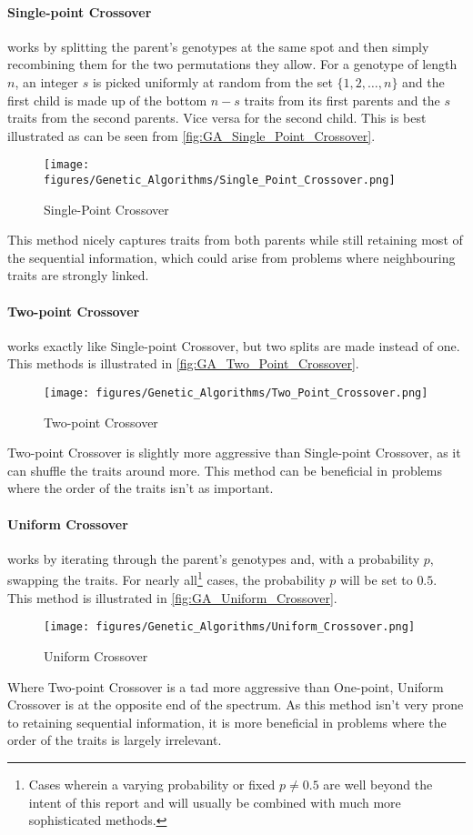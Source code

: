 \paragraph{Single-point Crossover} works by splitting the parent's genotypes at the same spot and then simply recombining them for the two permutations they allow. For a genotype of length $n$, an integer $s$ is picked uniformly at random from the set $\{1, 2, \hdots, n\}$ and the first child is made up of the bottom $n - s$ traits from its first parents and the $s$ traits from the second parents. Vice versa for the second child. This is best illustrated as can be seen from \autoref{fig:GA_Single_Point_Crossover}.
\begin{figure}[H]
    \centering
    \texttt{[image: figures/Genetic\_Algorithms/Single\_Point\_Crossover.png]}
    \caption{Single-Point Crossover}
    \small
    \raggedright
    \label{fig:GA_Single_Point_Crossover}
\end{figure}
This method nicely captures traits from both parents while still retaining most of the sequential information, which could arise from problems where neighbouring traits are strongly linked.

\paragraph{Two-point Crossover} works exactly like Single-point Crossover, but two splits are made instead of one. This methods is illustrated in \autoref{fig:GA_Two_Point_Crossover}.
\begin{figure}[H]
    \centering
    \texttt{[image: figures/Genetic\_Algorithms/Two\_Point\_Crossover.png]}
    \caption{Two-point Crossover}
    \small
    \raggedright
    \label{fig:GA_Two_Point_Crossover}
\end{figure}
Two-point Crossover is slightly more aggressive than Single-point Crossover, as it can shuffle the traits around more. This method can be beneficial in problems where the order of the traits isn't as important.

\paragraph{Uniform Crossover} works by iterating through the parent's genotypes and, with a probability $p$, swapping the traits. For nearly all\footnote{Cases wherein a varying probability or fixed $p \neq 0.5$ are well beyond the intent of this report and will usually be combined with much more sophisticated methods.} cases, the probability $p$ will be set to $0.5$. This method is illustrated in \autoref{fig:GA_Uniform_Crossover}.
\begin{figure}[H]
    \centering
    \texttt{[image: figures/Genetic\_Algorithms/Uniform\_Crossover.png]}
    \caption{Uniform Crossover}
    \small
    \raggedright
    \label{fig:GA_Uniform_Crossover}
\end{figure}
Where Two-point Crossover is a tad more aggressive than One-point, Uniform Crossover is at the opposite end of the spectrum. As this method isn't very prone to retaining sequential information, it is more beneficial in problems where the order of the traits is largely irrelevant.

